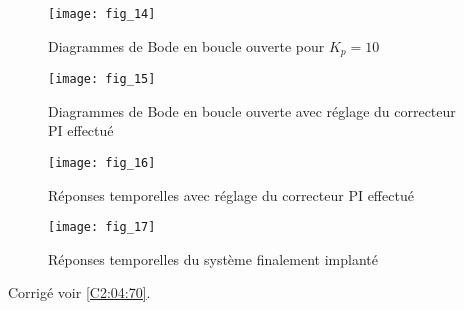 

\begin{figure}[H]
\centering
\texttt{[image: fig\_14]}
\caption{Diagrammes de Bode en boucle ouverte pour $K_p = 10$\label{fig_14}}
\end{figure}


\begin{figure}[H]
\centering
\texttt{[image: fig\_15]}
\caption{Diagrammes de Bode en boucle ouverte avec réglage du correcteur PI effectué \label{fig_15}}
\end{figure}

\begin{figure}[H]
\centering
\texttt{[image: fig\_16]}
\caption{Réponses temporelles avec réglage du correcteur PI effectué \label{fig_16}}
\end{figure}


\begin{figure}[H]
\centering
\texttt{[image: fig\_17]}
\caption{Réponses temporelles du système finalement implanté\label{fig_17}}
\end{figure}


\ifprof
\else

\noindent\footnotesize
\normalsize

\begin{flushright}
\footnotesize{Corrigé  voir \ref{C2:04:70}.}
\end{flushright}%
\fi